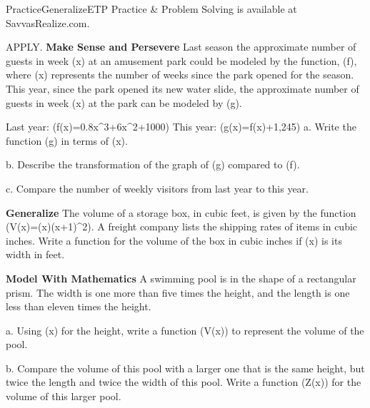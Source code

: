 \documentclass{article}
\newenvironment{practice}[2]{}{}        %
\newenvironment{te-addendum}[2]{}{}     %
\newcommand{\answer}[1]{}               %
\newcommand{\placeholder}[2]{}          %
\newcommand{\te}[1]{}                   %
\begin{document}
\begin{te-addendum}{Practice}{GeneralizeETP}
Practice \& Problem Solving is available at SavvasRealize.com.
\end{te-addendum}
\begin{practice}{22}{2}
APPLY. \textbf{Make Sense and Persevere} Last season the approximate number of guests in week (x) at an amusement park could be modeled by the function, (f), where (x) represents the number of weeks since the park opened for the season. This year, since the park opened its new water slide, the approximate number of guests in week (x) at the park can be modeled by (g).
\placeholder{photo}{Two water-slide photos. Last year: f(x)=0.8x cubed+6x squared+1000. This year: g(x)=f(x)+1,245.}
Last year: (f(x)=0.8x^3+6x^2+1000)
This year: (g(x)=f(x)+1,245)
a. Write the function (g) in terms of (x).
\answer{(g(x)=f(x)+1,245=0.8x^3+6x^2+2,245)}
b. Describe the transformation of the graph of (g) compared to (f).
\answer{a shift 1,245 units upward}
c. Compare the number of weekly visitors from last year to this year.
\answer{an increase of 1,245 weekly visitors}
\end{practice}
\begin{practice}{23}{2}
\textbf{Generalize} The volume of a storage box, in cubic feet, is given by the function (V(x)=(x)(x+1)^2). A freight company lists the shipping rates of items in cubic inches. Write a function for the volume of the box in cubic inches if (x) is its width in feet.
\answer{(V(x)=1,728x^3+288x^2+12x)}
\te{Printed answer substitutes 12x; converting the full volume while retaining x in feet would multiply the original polynomial by 1728.}
\end{practice}
\begin{practice}{24}{2}
\textbf{Model With Mathematics} A swimming pool is in the shape of a rectangular prism. The width is one more than five times the height, and the length is one less than eleven times the height.
\placeholder{illustration}{Cutaway rectangular swimming pool, length arrow l along long edge, width w across water, vertical depth h. People and pool building in background.}
a. Using (x) for the height, write a function (V(x)) to represent the volume of the pool.
\answer{(V(x)=55x^3+6x^2-x)}
b. Compare the volume of this pool with a larger one that is the same height, but twice the length and twice the width of this pool. Write a function (Z(x)) for the volume of this larger pool.
\answer{(Z(x)=220x^3+24x-4x)}
\te{Printed middle term 24x; likely 24x squared.}
\end{practice}
\end{document}
